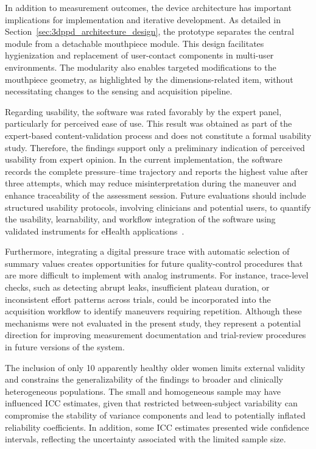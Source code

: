 \documentclass{ieeeaccess}
\begin{document}
In addition to measurement outcomes, the device architecture has important implications for implementation and iterative development. As detailed in Section~\ref{sec:3dppd_architecture_design}, the prototype separates the central module from a detachable mouthpiece module. This design facilitates hygienization and replacement of user-contact components in multi-user environments. The modularity also enables targeted modifications to the mouthpiece geometry, as highlighted by the dimensions-related item, without necessitating changes to the sensing and acquisition pipeline.

{Regarding usability, the software was rated favorably by the expert panel, particularly for perceived ease of use. This result was obtained as part of the expert-based content-validation process and does not constitute a formal usability study. Therefore, the findings support only a preliminary indication of perceived usability from expert opinion. In the current implementation, the software records the complete pressure--time trajectory and reports the highest value after three attempts, which may reduce misinterpretation during the maneuver and enhance traceability of the assessment session. Future evaluations should include structured usability protocols, involving clinicians and potential users, to quantify the usability, learnability, and workflow integration of the software using validated instruments for eHealth applications~\mbox{\cite{Maramba2019}}.}

Furthermore, integrating a digital pressure trace with automatic selection of summary values {creates opportunities for future quality-control procedures that are more difficult to implement with analog instruments.} For instance, trace-level checks, such as detecting abrupt leaks, insufficient plateau duration, or inconsistent effort patterns across trials, could be incorporated into the acquisition workflow to identify maneuvers requiring repetition. Although these mechanisms were not evaluated in the present study, they represent a {potential direction for improving measurement documentation and trial-review procedures in future versions of the system.}

{The inclusion of only {10} apparently healthy older women limits external validity and constrains the generalizability of the findings to broader and clinically heterogeneous populations. The small and homogeneous sample may have influenced ICC estimates, given that restricted between-subject variability can compromise the stability of variance components and lead to potentially inflated reliability coefficients. {In addition, some ICC estimates presented wide confidence intervals, reflecting the uncertainty associated with the limited sample size}.}
\end{document}
